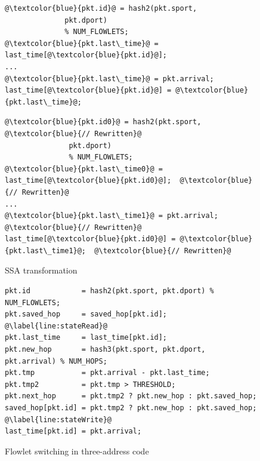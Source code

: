\begin{figure}[!t]
  \begin{minipage}{0.43\textwidth}
  \begin{small}
  \begin{lstlisting}[style=customc]
@\textcolor{blue}{pkt.id}@ = hash2(pkt.sport,
              pkt.dport)
              % NUM_FLOWLETS;
@\textcolor{blue}{pkt.last\_time}@ = last_time[@\textcolor{blue}{pkt.id}@];
...
@\textcolor{blue}{pkt.last\_time}@ = pkt.arrival;
last_time[@\textcolor{blue}{pkt.id}@] = @\textcolor{blue}{pkt.last\_time}@;
  \end{lstlisting}
  \end{small}
  \end{minipage}
  \begin{minipage}{0.57\textwidth}
  \begin{small}
  \begin{lstlisting}[style=customc]
@\textcolor{blue}{pkt.id0}@ = hash2(pkt.sport, @\textcolor{blue}{// Rewritten}@
               pkt.dport)
               % NUM_FLOWLETS;
@\textcolor{blue}{pkt.last\_time0}@ = last_time[@\textcolor{blue}{pkt.id0}@];  @\textcolor{blue}{// Rewritten}@
...
@\textcolor{blue}{pkt.last\_time1}@ = pkt.arrival;  @\textcolor{blue}{// Rewritten}@
last_time[@\textcolor{blue}{pkt.id0}@] = @\textcolor{blue}{pkt.last\_time1}@;  @\textcolor{blue}{// Rewritten}@
  \end{lstlisting}
  \end{small}
  \end{minipage}
  \caption{SSA transformation\protect\footnotemark}
\label{fig:ssa}
\end{figure}

\begin{figure}[!t]
\begin{lstlisting}[style=customc]
pkt.id            = hash2(pkt.sport, pkt.dport) % NUM_FLOWLETS;
pkt.saved_hop     = saved_hop[pkt.id]; @\label{line:stateRead}@
pkt.last_time     = last_time[pkt.id];
pkt.new_hop       = hash3(pkt.sport, pkt.dport, pkt.arrival) % NUM_HOPS;
pkt.tmp           = pkt.arrival - pkt.last_time;
pkt.tmp2          = pkt.tmp > THRESHOLD;
pkt.next_hop      = pkt.tmp2 ? pkt.new_hop : pkt.saved_hop;
saved_hop[pkt.id] = pkt.tmp2 ? pkt.new_hop : pkt.saved_hop; @\label{line:stateWrite}@
last_time[pkt.id] = pkt.arrival;
\end{lstlisting}
\caption{Flowlet switching in three-address code\protect\footnotemark}
\label{fig:three_address}
\end{figure}

